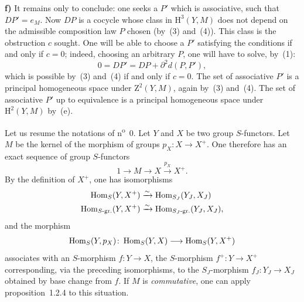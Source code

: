 \textbf{f)} It remains only to conclude: one seeks a \(P'\) which is
associative, \ie such that \(DP'=e_{M}\). Now \(DP\) is a cocycle whose
class in \(\mathrm{H}^{3}(Y,M)\) does not depend on the admissible
composition law \(P\) chosen (by~(3) and~(4)). This class is the obstruction
\(c\) sought. One will be able to choose a \(P'\) satisfying the conditions
if and only if \(c=0\); indeed, choosing an arbitrary \(P\), one will have
to solve, by~(1):
\[
0=DP'=DP+\partial^{2}d(P,P'),
\]
which is possible by~(3) and~(4) if and only if \(c=0\). The set of
associative \(P'\) is a principal homogeneous space under
\(\mathrm{Z}^{2}(Y,M)\), again by~(3) and~(4). The set of associative
\(P'\) up to equivalence is a principal homogeneous space under
\(\mathrm{H}^{2}(Y,M)\) by~(e).

\label{III.sec.2}

Let us resume the notations of n\textsuperscript{o}~0. Let \(Y\) and \(X\) be
two group \(S\)-functors. Let \(M\) be the kernel of the morphism of groups
\(p_{X}\colon X\to X^{+}\). One therefore has an exact sequence of group
\(S\)-functors
\[
1\longrightarrow M\longrightarrow X\xrightarrow{p_{X}}X^{+}.
\]
By the definition of \(X^{+}\), one has isomorphisms
\begin{align*}
\operatorname{Hom}_{S}(Y,X^{+})
  &\xrightarrow{\sim}\operatorname{Hom}_{S_{J}}(Y_{J},X_{J})\\
\operatorname{Hom}_{S\textup{-gr.}}(Y,X^{+})
  &\xrightarrow{\sim}\operatorname{Hom}_{S_{J}\textup{-gr.}}(Y_{J},X_{J}),
\end{align*}
and the morphism
\[
\operatorname{Hom}_{S}(Y,p_{X})\colon
\operatorname{Hom}_{S}(Y,X)\longrightarrow\operatorname{Hom}_{S}(Y,X^{+})
\]
associates with an \(S\)-morphism \(f\colon Y\to X\), the \(S\)-morphism
\(f^{+}\colon Y\to X^{+}\) corresponding, via the preceding isomorphisms, to
the \(S_{J}\)-morphism \(f_{J}\colon Y_{J}\to X_{J}\) obtained by base change
from \(f\). If \(M\) is \emph{commutative}, one can apply proposition~1.2.4
to this situation.

